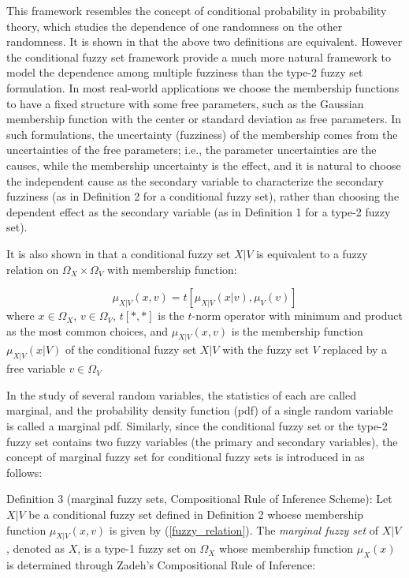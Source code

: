 \documentclass[journal]{IEEEtran}
\begin{document}
This framework resembles the concept of conditional probability in probability theory, which studies the dependence of one randomness on the other randomness. It is shown in \cite{wang_new_2016} that the above two definitions are equivalent. However the conditional fuzzy set framework provide a much more natural framework to model the dependence among multiple fuzziness than the type-2 fuzzy set formulation.
In most real-world applications we choose the membership functions to have a fixed structure with some free parameters, such as the Gaussian membership function with the center or standard deviation as free parameters. In such formulations, the uncertainty (fuzziness) of the membership comes from the uncertainties of the free parameters; i.e., the parameter uncertainties are the causes, while the membership uncertainty is the effect, and it is natural to choose the independent cause as the secondary variable to characterize the secondary fuzziness (as in Definition 2 for a conditional fuzzy set), rather than choosing the dependent effect as the secondary variable (as in Definition 1 for a type-2 fuzzy set).

It is also shown in\cite{wang_new_2016} that a conditional fuzzy set $X|V$ is equivalent to a fuzzy relation on $\Omega_X\times\Omega_V$ with membership function:

\begin{equation}
\label{fuzzy_relation}
\mu_{X|V}(x,v)=t[\mu_{X|V}(x|v),\mu_V(v)]
\end{equation}
where $x\in\Omega_X$, $v\in\Omega_V$, $t[*,*]$ is the $t$-norm operator with minimum and product as the most common choices, and $\mu_{X|V}(x,v)$ is the membership function $\mu_{X|V}(x|V)$ of the conditional fuzzy set $X|V$ with the fuzzy set $V$  replaced by a free variable $v\in\Omega_V$

In the study of several random variables, the statistics of each are called marginal, and the probability density function (pdf) of a single random variable is called a marginal pdf. Similarly, since the conditional fuzzy set or the type-2 fuzzy set contains two fuzzy variables (the primary and secondary variables), the concept of marginal fuzzy set for conditional fuzzy sets is introduced in \cite{wang_new_2016} as follows:

Definition 3 (marginal fuzzy sets, Compositional Rule of Inference Scheme): Let $X|V$ be a conditional fuzzy set defined in Definition 2 whoese membership function $\mu_{X|V}(x,v)$ is given by (\ref{fuzzy_relation}). The \emph{marginal fuzzy set} of $X|V$, denoted as $X$, is a type-1 fuzzy set on $\Omega_X$ whose membership function $\mu_X(x)$ is determined through Zadeh's Compositional Rule of Inference:
\end{document}
